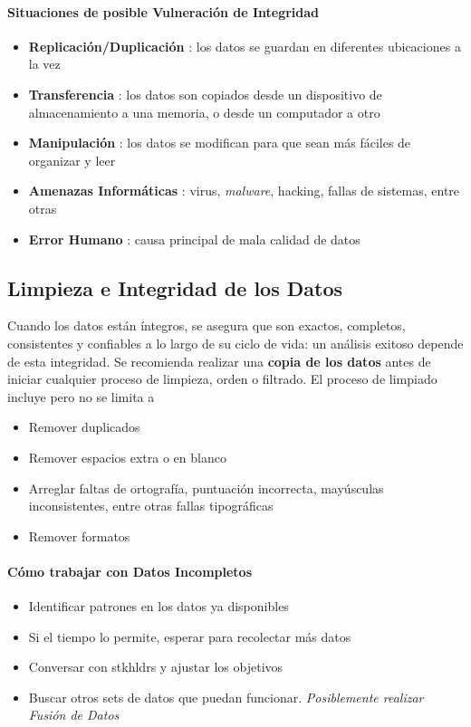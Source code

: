 \paragraph{Situaciones de posible Vulneración de Integridad}
\begin{itemize}
    \item {\textbf{Replicación/Duplicación} : los datos se guardan en diferentes ubicaciones a la vez}
    \item {\textbf{Transferencia} : los datos son copiados desde un dispositivo de almacenamiento a una memoria, o desde un computador a otro}
    \item {\textbf{Manipulación} : los datos se modifican para que sean más fáciles de organizar y leer} 
    \item {\textbf{Amenazas Informáticas} : virus, \textit{malware}, hacking, fallas de sistemas, entre otras}
    \item {\textbf{Error Humano} : causa principal de mala calidad de datos}
\end{itemize}

\subsection{Limpieza e Integridad de los Datos}
Cuando los datos están íntegros, se asegura que son exactos, completos, consistentes y confiables a lo largo de su ciclo de vida: un análisis exitoso depende de esta integridad. Se recomienda realizar una \textbf{copia de los datos} antes de iniciar cualquier proceso de limpieza, orden o filtrado. El proceso de limpiado incluye pero no se limita a 
\begin{itemize}
    \item {Remover duplicados}
    \item {Remover espacios extra o en blanco}
    \item {Arreglar faltas de ortografía, puntuación incorrecta, mayúsculas inconsistentes, entre otras fallas tipográficas}
    \item {Remover formatos}
\end{itemize}
\paragraph{Cómo trabajar con Datos Incompletos}
\begin{itemize}
    \item {Identificar patrones en los datos ya disponibles}
    \item {Si el tiempo lo permite, esperar para recolectar más datos}
    \item {Conversar con \gls{stkhldrs} y ajustar los objetivos}
    \item {Buscar otros sets de datos que puedan funcionar. \textit{Posiblemente realizar Fusión de Datos}}
\end{itemize}


